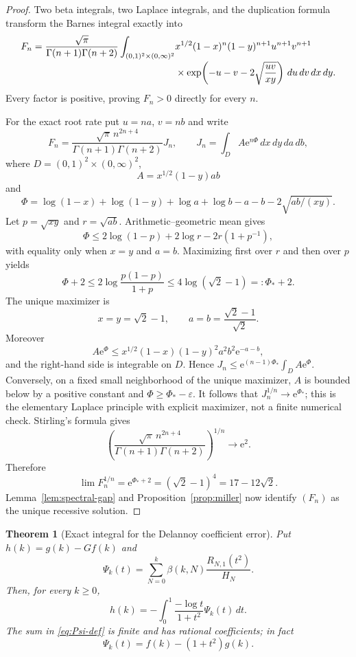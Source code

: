 \documentclass[11pt]{article}
\newtheorem{theorem}{Theorem}
\theoremstyle{remark}
\newcommand{\e}{\mathrm e}
\begin{document}
\begin{proof}
Two beta integrals, two Laplace integrals, and the duplication formula
transform the Barnes integral exactly into
\begin{align}
F_n=\frac{\sqrt\pi}{\Gamma(n+1)\Gamma(n+2)}
\int_{(0,1)^2\times(0,\infty)^2}
 &x^{1/2}(1-x)^n(1-y)^{n+1}u^{n+1}v^{n+1}\notag\\[-2pt]
 &\times\exp\!\left(-u-v-2\sqrt{\frac{uv}{xy}}\right)
 \,du\,dv\,dx\,dy.\label{eq:positive-F}
\end{align}
Every factor is positive, proving $F_n>0$ directly for every $n$.

For the exact root rate put $u=na$, $v=nb$ and write
\[
 F_n=\frac{\sqrt\pi\,n^{2n+4}}{\Gamma(n+1)\Gamma(n+2)}J_n,\qquad
 J_n=\int_D A\e^{n\Phi}\,dx\,dy\,da\,db,
\]
where $D=(0,1)^2\times(0,\infty)^2$,
\[
 A=x^{1/2}(1-y)ab
\]
and
\[
 \Phi=\log(1-x)+\log(1-y)+\log a+\log b-a-b
       -2\sqrt{ab/(xy)}.
\]
Let $p=\sqrt{xy}$ and $r=\sqrt{ab}$.  Arithmetic--geometric mean
gives
\[
 \Phi\leq2\log(1-p)+2\log r-2r(1+p^{-1}),
\]
with equality only when $x=y$ and $a=b$.  Maximizing first over $r$
and then over $p$ yields
\[
 \Phi+2\leq2\log\frac{p(1-p)}{1+p}
 \leq4\log(\sqrt2-1)=:\Phi_*+2.
\]
The unique maximizer is
\[
 x=y=\sqrt2-1,\qquad a=b=\frac{\sqrt2-1}{\sqrt2}.
\]
Moreover
\[
 A\e^\Phi\leq
 x^{1/2}(1-x)(1-y)^2a^2b^2\e^{-a-b},
\]
and the right-hand side is integrable on $D$.  Hence
$J_n\leq\e^{(n-1)\Phi_*}\int_DA\e^\Phi$.  Conversely, on a fixed
small neighborhood of the unique maximizer, $A$ is bounded below by
a positive constant and $\Phi\geq\Phi_*-\varepsilon$.  It follows
that $J_n^{1/n}\to\e^{\Phi_*}$; this is the elementary Laplace
principle with explicit maximizer, not a finite numerical check.
Stirling's formula gives
\[
 \left(\frac{\sqrt\pi\,n^{2n+4}}
 {\Gamma(n+1)\Gamma(n+2)}\right)^{1/n}\longrightarrow\e^2.
\]
Therefore
\[
 \lim F_n^{1/n}=\e^{\Phi_*+2}=(\sqrt2-1)^4=17-12\sqrt2.
\]
Lemma~\ref{lem:spectral-gap} and Proposition~\ref{prop:miller}
now identify $(F_n)$ as the unique recessive solution.
\end{proof}

\begin{theorem}[Exact integral for the Delannoy coefficient error]
\label{thm:coefficient-error}
Put $h(k)=g(k)-Gf(k)$ and
\begin{equation}\label{eq:Psi-def}
 \Psi_k(t)=\sum_{N=0}^k\beta(k,N)\frac{R_{N,1}(t^2)}{H_N}.
\end{equation}
Then, for every $k\geq0$,
\begin{equation}\label{eq:h-integral-final}
 h(k)=-\int_0^1\frac{-\log t}{1+t^2}\Psi_k(t)\,dt.
\end{equation}
The sum in \eqref{eq:Psi-def} is finite and has rational
coefficients; in fact
\begin{equation}\label{eq:Psi-affine}
                 \Psi_k(t)=f(k)-(1+t^2)g(k).
\end{equation}
\end{theorem}
\end{document}
